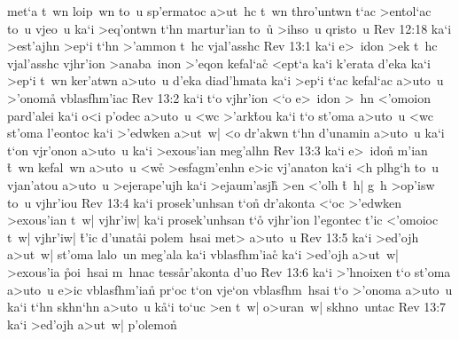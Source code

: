 met`a
t~wn
loip~wn
to~u
sp'ermatoc
a>ut~hc
t~wn
thro'untwn
t`ac
>entol`ac
to~u
vjeo~u
ka`i
>eq'ontwn
t`hn
martur'ian
to~u\r{}
>ihso~u
qristo~u\bibvsend
\vs Rev 12:18
ka`i
>est'ajhn
>ep`i
t`hn
>'ammon
t~hc
vjal'asshc\bibvsend
\vs Rev 13:1
ka`i
e>~idon
>ek
t~hc
vjal'asshc
vjhr'ion
>anaba~inon
>'eqon
kefal`ac\r{}
<ept`a
ka`i
k'erata
d'eka
ka`i
>ep`i
t~wn
ker'atwn
a>uto~u
d'eka
diad'hmata
ka`i
>ep`i
t`ac
kefal`ac
a>uto~u
>'onom\r{a}
vblasfhm'iac\bibvsend
\vs Rev 13:2
ka`i
t`o
vjhr'ion
<`o
e>~idon
>~hn
<'omoion
pard'alei
ka`i
o<i
p'odec
a>uto~u
<wc
>'ark\r{t}ou
ka`i
t`o
st'oma
a>uto~u
<wc
st'oma
l'eontoc
ka`i
>'edwken
a>ut~w|
<o
dr'akwn
t`hn
d'unamin
a>uto~u
ka`i
t`on
vjr'onon
a>uto~u
ka`i
>exous'ian
meg'alhn\bibvsend
\vs Rev 13:3
ka`i
e>~ido\r{n}
m'ian
\r{t}~wn
kefal~wn
a>uto~u
<w\r{c}
>esfagm'enhn
e>ic
vj'anaton
ka`i
<h
plhg`h
to~u
vjan'atou
a>uto~u
>ejerape'ujh
ka`i
>ejaum'asjh\r{}
>en
<'olh
\r{t}~h|
g~h
>op'isw
to~u
vjhr'iou\bibvsend
\vs Rev 13:4
ka`i
prosek'unhsan
t`on\r{}
dr'akonta
<`oc
>'edwken
>exous'ian
t~w|
vjhr'iw|
ka`i
prosek'unhsan
t`o\r{}
vjhr'ion
l'egontec
t'ic
<'omoioc
t~w|
vjhr'iw|
\r{t}'ic
d'unat\r{a}i
polem~hsai
met>
a>uto~u\bibvsend
\vs Rev 13:5
ka`i
>ed'ojh
a>ut~w|
st'oma
lalo~un
meg'ala
ka`i
vblasfhm'ia\r{c}
ka`i
>ed'ojh
a>ut~w|
>exous'ia
\r{p}oi~hsai
m~hnac
tess\r{a}r'akonta
d'uo\bibvsend
\vs Rev 13:6
ka`i
>'hnoixen
t`o
st'oma
a>uto~u
e>ic
vblasfhm'ia\r{n}
pr`oc
t`on
vje`on
vblasfhm~hsai
t`o
>'onoma
a>uto~u
ka`i
t`hn
skhn`hn
a>uto~u
k\r{a}`i
to`uc
>en
t~w|
o>uran~w|
skhno~untac\bibvsend
\vs Rev 13:7
ka`i
>ed'ojh
a>ut~w|
p'olemon\r{}

